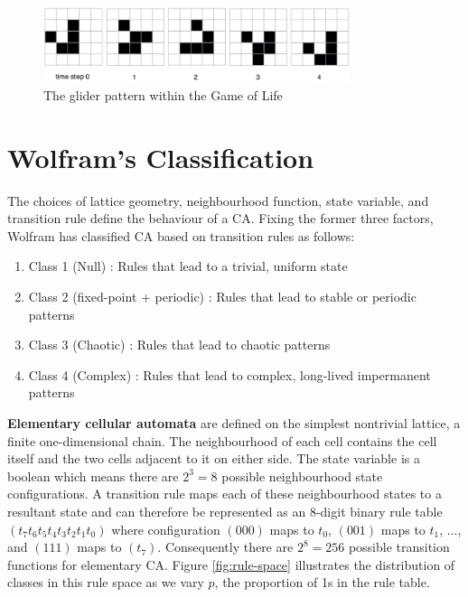 \begin{figure}[!h]
\centering
\includegraphics[width=0.8\textwidth]{images/life-glider.png}
\caption{The glider pattern within the Game of Life \cite{dorin2012framework}}
\label{fig:life-glider}
\end{figure}

\section{Wolfram's Classification}

The choices of lattice geometry, neighbourhood function, state variable, and transition rule define the behaviour of a CA. Fixing the former three factors, Wolfram \cite{wolfram1986theory} has classified CA based on transition rules as follows:
\begin{enumerate}
  \item Class 1 (Null) : Rules that lead to a trivial, uniform state
  \item Class 2 (fixed-point + periodic) : Rules that lead to stable or periodic patterns
  \item Class 3 (Chaotic) : Rules that lead to chaotic patterns
  \item Class 4 (Complex) : Rules that lead to complex, long-lived impermanent patterns
\end{enumerate}

\textbf{Elementary cellular automata} are defined on the simplest nontrivial lattice, a finite one-dimensional chain. The neighbourhood of each cell contains the cell itself and the two cells adjacent to it on either side. The state variable is a boolean which means there are $2^3 = 8$ possible neighbourhood state configurations. A transition rule maps each of these neighbourhood states to a resultant state and can therefore be represented as an 8-digit binary rule table $(t_7t_6t_5t_4t_3t_2t_1t_0)$ where configuration $(000)$ maps to $t_0$, $(001)$ maps to $t_1$, ..., and $(111)$ maps to $(t_7)$. Consequently there are $2^8=256$ possible transition functions for elementary CA. Figure \ref{fig:rule-space} illustrates the distribution of classes in this rule space as we vary $p$, the proportion of 1s in the rule table. \\

